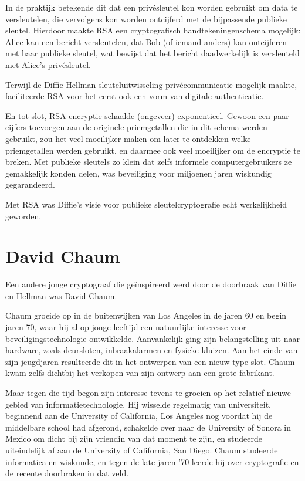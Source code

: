 \documentclass[
  a5paper,
  smalldemyvopaper,11pt,twoside,onecolumn,openright,extrafontsizes]{memoir}
\begin{document}
In de praktijk betekende dit dat een privésleutel kon worden gebruikt om
data te versleutelen, die vervolgens kon worden ontcijferd met de
bijpassende publieke sleutel. Hierdoor maakte RSA een cryptografisch
handtekeningenschema mogelijk: Alice kan een bericht versleutelen, dat
Bob (of iemand anders) kan ontcijferen met haar publieke sleutel, wat
bewijst dat het bericht daadwerkelijk is versleuteld met Alice's
privésleutel.

Terwijl de Diffie-Hellman sleuteluitwisseling privécommunicatie mogelijk
maakte, faciliteerde RSA voor het eerst ook een vorm van digitale
authenticatie.

En tot slot, RSA-encryptie schaalde (ongeveer) exponentieel. Gewoon een
paar cijfers toevoegen aan de originele priemgetallen die in dit schema
werden gebruikt, zou het veel moeilijker maken om later te ontdekken
welke priemgetallen werden gebruikt, en daarmee ook veel moeilijker om
de encryptie te breken. Met publieke sleutels zo klein dat zelfs
informele computergebruikers ze gemakkelijk konden delen, was
beveiliging voor miljoenen jaren wiskundig gegarandeerd.

Met RSA was Diffie's visie voor publieke sleutelcryptografie echt
werkelijkheid geworden.

\section{David Chaum}\label{david-chaum}

Een andere jonge cryptograaf die geïnspireerd werd door de doorbraak van
Diffie en Hellman was David Chaum.

Chaum groeide op in de buitenwijken van Los Angeles in de jaren 60 en
begin jaren 70, waar hij al op jonge leeftijd een natuurlijke interesse
voor beveiligingstechnologie ontwikkelde. Aanvankelijk ging zijn
belangstelling uit naar hardware, zoals deursloten, inbraakalarmen en
fysieke kluizen. Aan het einde van zijn jeugdjaren resulteerde dit in
het ontwerpen van een nieuw type slot. Chaum kwam zelfs dichtbij het
verkopen van zijn ontwerp aan een grote fabrikant.

Maar tegen die tijd begon zijn interesse tevens te groeien op het
relatief nieuwe gebied van informatietechnologie. Hij wisselde
regelmatig van universiteit, beginnend aan de University of California,
Los Angeles nog voordat hij de middelbare school had afgerond, schakelde
over naar de University of Sonora in Mexico om dicht bij zijn vriendin
van dat moment te zijn, en studeerde uiteindelijk af aan de University
of California, San Diego. Chaum studeerde informatica en wiskunde, en
tegen de late jaren '70 leerde hij over cryptografie en de recente
doorbraken in dat veld.
\end{document}
